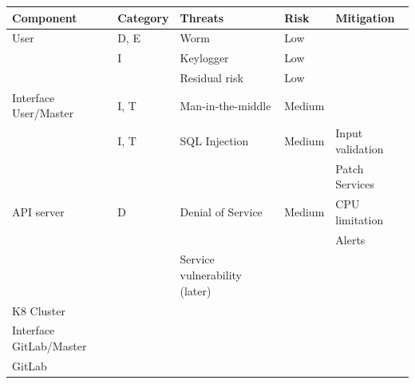 \begin{tabular}{lllll}
    \textbf{Component} & \textbf{Category} & \textbf{Threats} & \textbf{Risk} & \textbf{Mitigation} \\
    \hline
    User                & D, E & Worm & Low & \\
                        & I & Keylogger & Low & \\
                        & & Residual risk & Low & \\
    \hline
    Interface User/Master   & I, T & Man-in-the-middle & Medium & \\
                            & I, T & SQL Injection & Medium & Input validation \\
                            & & & & Patch Services \\
    \hline
    API server          & D & Denial of Service & Medium & CPU limitation \\
                        & & & & Alerts \\
                        & & Service vulnerability (later) & & \\
    \hline
    K8 Cluster             & & & & \\
    \hline
    Interface GitLab/Master & & & & \\
    \hline
    GitLab              & & & & \\
    \hline
\end{tabular}